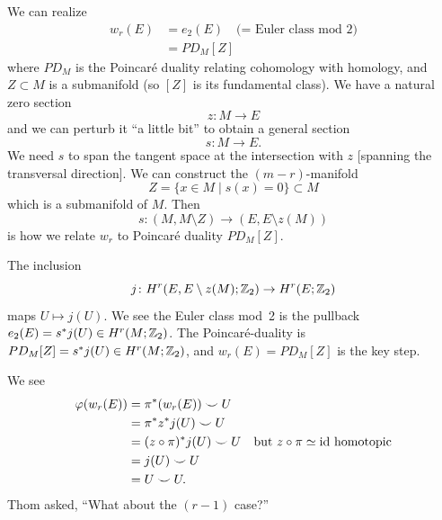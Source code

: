 \begin{observation}[Thom?]
We can realize
\begin{subequations}
  \begin{align}
w_{r}(E) &= e_{2}(E)\quad\mbox{(= Euler class mod 2)}\\
&= PD_{M}[Z]
  \end{align}
\end{subequations}
where $PD_{M}$ is the Poincar\'{e} duality relating cohomology with
homology, and $Z\subset M$ is a submanifold (so $[Z]$ is its
fundamental class). We have a natural zero section
\begin{equation}
z\colon M\to E
\end{equation}
and we can perturb it ``a little bit'' to obtain a general section
\begin{equation}
s\colon M\to E.
\end{equation}
We need $s$ to span the tangent space at the intersection with $z$
[spanning the transversal direction]. We can construct the
$(m-r)$-manifold
\begin{equation}
Z=\{x\in M\mid s(x)=0\}\subset M
\end{equation}
which is a submanifold of $M$. Then
\begin{equation}
s\colon(M,M\setminus Z)\to(E,E\setminus z(M))
\end{equation}
is how we relate $w_{r}$ to Poincar\'{e} duality $PD_{M}[Z]$.

The inclusion
\begin{equation}
j\colon H^{r}(E,E\setminus z(M);\mathbb{Z}_{2})\to H^{r}(E;\mathbb{Z}_{2})
\end{equation}
maps $U\mapsto j(U)$. We see the Euler class mod~2 is the pullback
$e_{2}(E)=s^{*}j(U)\in H^{r}(M;\mathbb{Z}_{2})$. The Poincar\'{e}-duality is
$PD_{M}[Z]=s^{*}j(U)\in H^{r}(M;\mathbb{Z}_{2})$, and $w_{r}(E)=PD_{M}[Z]$ is
the key step.

We see
\begin{subequations}
  \begin{align}
\varphi(w_{r}(E)) &= \pi^{*}(w_{r}(E))\smile U\\
&= \pi^{*}z^{*}j(U)\smile U\\
&=(z\circ\pi)^{*}j(U)\smile U\quad\mbox{but $z\circ\pi\simeq\operatorname{id}$ homotopic}\\
&=j(U)\smile U\\
&= U\smile U.
  \end{align}
\end{subequations}
Thom asked, ``What about the $(r-1)$ case?''
\end{observation}

